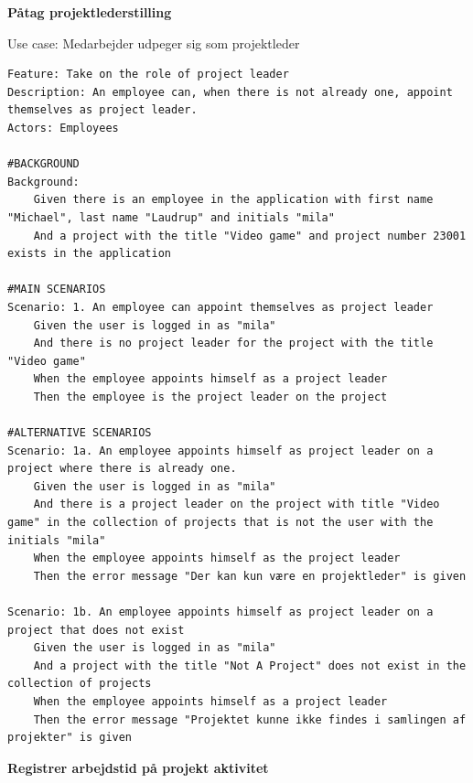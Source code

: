 \textbf{Påtag projektlederstilling}
\begin{listing}[H]
    \centering
    \caption{Use case: Medarbejder udpeger sig som projektleder} \label{lst:usecase_bliv_projektleder}
    \begin{verbatim}  
Feature: Take on the role of project leader
Description: An employee can, when there is not already one, appoint themselves as project leader.
Actors: Employees

#BACKGROUND
Background:
    Given there is an employee in the application with first name "Michael", last name "Laudrup" and initials "mila"
    And a project with the title "Video game" and project number 23001 exists in the application

#MAIN SCENARIOS
Scenario: 1. An employee can appoint themselves as project leader
    Given the user is logged in as "mila"
    And there is no project leader for the project with the title "Video game"
    When the employee appoints himself as a project leader
    Then the employee is the project leader on the project

#ALTERNATIVE SCENARIOS
Scenario: 1a. An employee appoints himself as project leader on a project where there is already one.
    Given the user is logged in as "mila"
    And there is a project leader on the project with title "Video game" in the collection of projects that is not the user with the initials "mila"
    When the employee appoints himself as the project leader
    Then the error message "Der kan kun være en projektleder" is given

Scenario: 1b. An employee appoints himself as project leader on a project that does not exist
    Given the user is logged in as "mila"
    And a project with the title "Not A Project" does not exist in the collection of projects
    When the employee appoints himself as a project leader
    Then the error message "Projektet kunne ikke findes i samlingen af projekter" is given
    \end{verbatim}
\end{listing}
\textbf{Registrer arbejdstid på projekt aktivitet}
